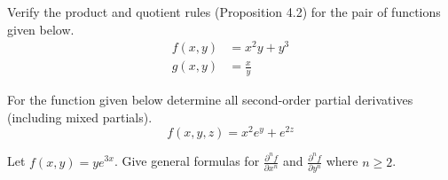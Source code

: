 \documentclass[oneperpage]{gsypset}
\begin{document}
	\begin{problem}[2.4.5]
		Verify the product and quotient rules (Proposition 4.2) for the pair of functions given below.
		\begin{align*}
			f(x,y) &= x^2y + y^3 \\
			g(x,y) &= \frac{x}{y}
		\end{align*}
	\end{problem}
	\begin{solution}
		
	\end{solution}
	
	\begin{problem}[2.4.17]
		For the function given below determine all second-order partial derivatives
		(including mixed partials).
		\[
			f(x,y,z) = x^2e^y + e^{2z}
		\]
	\end{problem}
	\begin{solution}
		
	\end{solution}
	
	\begin{problem}[2.4.23]
		Let $f(x,y) = ye^{3x}$.
		Give general formulas for 
		$\frac{\partial^n f}{\partial x^n}$ and $\frac{\partial^n f}{\partial y^n}$
		where $n \geq 2$.
	\end{problem}
	\begin{solution}
		
	\end{solution}
	
\end{document}
